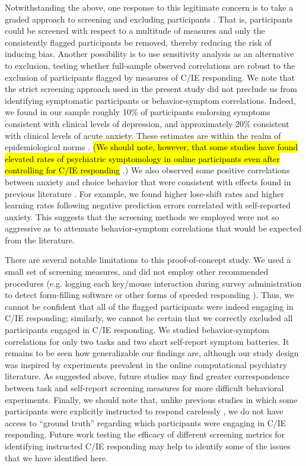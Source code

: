 \documentclass[a4paper,notitlepage,12pt]{article}
\begin{document}
\begin{refsection}[main]
Notwithstanding the above, one response to this legitimate concern is to take a graded approach to screening and excluding participants \cite{Kim2018-ev}. That is, participants could be screened with respect to a multitude of measures and only the consistently flagged participants be removed, thereby reducing the risk of inducing bias. Another possibility is to use sensitivity analysis as an alternative to exclusion, testing whether full-sample observed correlations are robust to the exclusion of participants flagged by measures of C/IE responding. We note that the strict screening approach used in the present study did not preclude us from identifying symptomatic participants or behavior-symptom correlations. Indeed, we found in our sample roughly 10\% of participants endorsing symptoms consistent with clinical levels of depression, and approximately 20\% consistent with clinical levels of acute anxiety. These estimates are within the realm of epidemiological norms \cite{kessler2012twelve, lowe2008validation, yarrington2021impact}. \hl{(We should note, however, that some studies have found elevated rates of psychiatric symptomology in online participants even after controlling for C/IE responding} \cite{ophir2020turker}.) We also observed some positive correlations between anxiety and choice behavior that were consistent with effects found in previous literature \cite{huang2017computational, harle2017anhedonia, garrett2018updating}. For example, we found higher lose-shift rates and higher learning rates following negative prediction errors correlated with self-reported anxiety. This suggests that the screening methods we employed were not so aggressive as to attenuate behavior-symptom correlations that would be expected from the literature. 

There are several notable limitations to this proof-of-concept study. We used a small set of screening measures, and did not employ other recommended procedures (e.g. logging each key/mouse interaction during survey administration to detect form-filling software or other forms of speeded responding \cite{buchanan2018methods}). Thus, we cannot be confident that all of the flagged participants were indeed engaging in C/IE responding; similarly, we cannot be certain that we correctly excluded all participants engaged in C/IE responding. We studied behavior-symptom correlations for only two tasks and two short self-report symptom batteries. It remains to be seen how generalizable our findings are, although our study design was inspired by experiments prevalent in the online computational psychiatry literature. As suggested above, future studies may find greater correspondence between task and self-report screening measures for more difficult behavioral experiments. Finally, we should note that, unlike previous studies in which some participants were explicitly instructed to respond carelessly \cite{buchanan2018methods}, we do not have access to ``ground truth'' regarding which participants were engaging in C/IE responding. Future work testing the efficacy of different screening metrics for identifying instructed C/IE responding may help to identify some of the issues that we have identified here.


\end{refsection}
\end{document}
